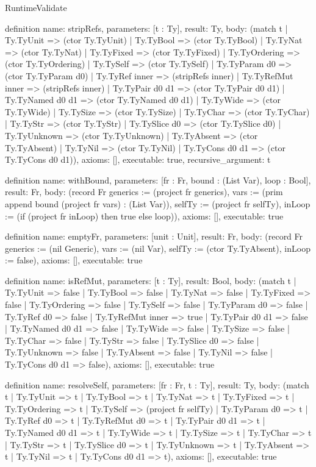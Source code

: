 \begin{lexlean}{RuntimeValidate}
\begin{semanticmodule}
definition{
  name: stripRefs,
  parameters: [t : Ty],
  result: Ty,
  body: (match t
    | Ty.TyUnit => (ctor Ty.TyUnit)
    | Ty.TyBool => (ctor Ty.TyBool)
    | Ty.TyNat => (ctor Ty.TyNat)
    | Ty.TyFixed => (ctor Ty.TyFixed)
    | Ty.TyOrdering => (ctor Ty.TyOrdering)
    | Ty.TySelf => (ctor Ty.TySelf)
    | Ty.TyParam d0 => (ctor Ty.TyParam d0)
    | Ty.TyRef inner => (stripRefs inner)
    | Ty.TyRefMut inner => (stripRefs inner)
    | Ty.TyPair d0 d1 => (ctor Ty.TyPair d0 d1)
    | Ty.TyNamed d0 d1 => (ctor Ty.TyNamed d0 d1)
    | Ty.TyWide => (ctor Ty.TyWide)
    | Ty.TySize => (ctor Ty.TySize)
    | Ty.TyChar => (ctor Ty.TyChar)
    | Ty.TyStr => (ctor Ty.TyStr)
    | Ty.TySlice d0 => (ctor Ty.TySlice d0)
    | Ty.TyUnknown => (ctor Ty.TyUnknown)
    | Ty.TyAbsent => (ctor Ty.TyAbsent)
    | Ty.TyNil => (ctor Ty.TyNil)
    | Ty.TyCons d0 d1 => (ctor Ty.TyCons d0 d1)),
  axioms: [],
  executable: true,
  recursive_argument: t
}

definition{
  name: withBound,
  parameters: [fr : Fr, bound : (List Var), loop : Bool],
  result: Fr,
  body: (record Fr {generics := (project fr generics), vars := (prim append bound (project fr vars) : (List Var)), selfTy := (project fr selfTy), inLoop := (if (project fr inLoop) then true else loop)}),
  axioms: [],
  executable: true
}

definition{
  name: emptyFr,
  parameters: [unit : Unit],
  result: Fr,
  body: (record Fr {generics := (nil Generic), vars := (nil Var), selfTy := (ctor Ty.TyAbsent), inLoop := false}),
  axioms: [],
  executable: true
}

definition{
  name: isRefMut,
  parameters: [t : Ty],
  result: Bool,
  body: (match t
    | Ty.TyUnit => false
    | Ty.TyBool => false
    | Ty.TyNat => false
    | Ty.TyFixed => false
    | Ty.TyOrdering => false
    | Ty.TySelf => false
    | Ty.TyParam d0 => false
    | Ty.TyRef d0 => false
    | Ty.TyRefMut inner => true
    | Ty.TyPair d0 d1 => false
    | Ty.TyNamed d0 d1 => false
    | Ty.TyWide => false
    | Ty.TySize => false
    | Ty.TyChar => false
    | Ty.TyStr => false
    | Ty.TySlice d0 => false
    | Ty.TyUnknown => false
    | Ty.TyAbsent => false
    | Ty.TyNil => false
    | Ty.TyCons d0 d1 => false),
  axioms: [],
  executable: true
}

definition{
  name: resolveSelf,
  parameters: [fr : Fr, t : Ty],
  result: Ty,
  body: (match t
    | Ty.TyUnit => t
    | Ty.TyBool => t
    | Ty.TyNat => t
    | Ty.TyFixed => t
    | Ty.TyOrdering => t
    | Ty.TySelf => (project fr selfTy)
    | Ty.TyParam d0 => t
    | Ty.TyRef d0 => t
    | Ty.TyRefMut d0 => t
    | Ty.TyPair d0 d1 => t
    | Ty.TyNamed d0 d1 => t
    | Ty.TyWide => t
    | Ty.TySize => t
    | Ty.TyChar => t
    | Ty.TyStr => t
    | Ty.TySlice d0 => t
    | Ty.TyUnknown => t
    | Ty.TyAbsent => t
    | Ty.TyNil => t
    | Ty.TyCons d0 d1 => t),
  axioms: [],
  executable: true
}


\end{semanticmodule}
\end{lexlean}
